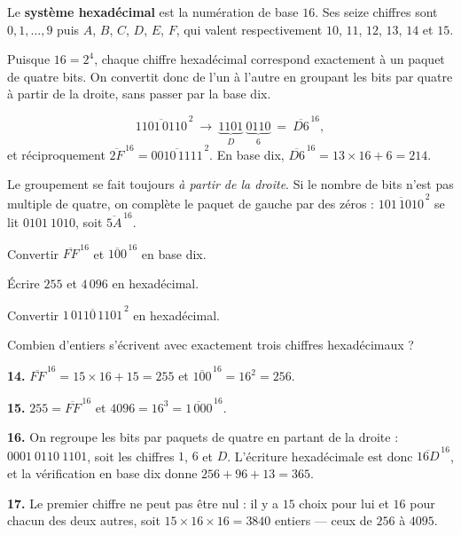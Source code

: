 \begin{definition}
Le \textbf{système hexadécimal} est la numération de base $16$. Ses seize
chiffres sont $0,1,\dots,9$ puis $A$, $B$, $C$, $D$, $E$, $F$, qui valent
respectivement $10$, $11$, $12$, $13$, $14$ et $15$.
\end{definition}

\begin{propriete}
Puisque $16 = 2^{4}$, chaque chiffre hexadécimal correspond exactement à un
paquet de quatre bits. On convertit donc de l'un à l'autre en groupant les
bits par quatre à partir de la droite, sans passer par la base dix.
\end{propriete}

\begin{exemple}
\[
  \overline{1101\,0110}^{\,2}
  \ \longrightarrow\ \underbrace{1101}_{D}\ \underbrace{0110}_{6}
  \ =\ \overline{D6}^{\,16},
\]
et réciproquement $\overline{2F}^{\,16} = \overline{0010\,1111}^{\,2}$. En
base dix, $\overline{D6}^{\,16} = 13\times16+6 = 214$.
\end{exemple}

\begin{avertissement}
Le groupement se fait toujours \emph{à partir de la droite}. Si le nombre de
bits n'est pas multiple de quatre, on complète le paquet de gauche par des
zéros : $\overline{101\,1010}^{\,2}$ se lit $0101\ 1010$, soit
$\overline{5A}^{\,16}$.
\end{avertissement}

\begin{entrainement}[hexadécimal]
\exo[\niveau{1}] Convertir $\overline{FF}^{\,16}$ et $\overline{100}^{\,16}$
en base dix.

\exo[\niveau{1}] Écrire $255$ et $4\,096$ en hexadécimal.

\exo[\niveau{2}] Convertir $\overline{1\,0110\,1101}^{\,2}$ en hexadécimal.

\exo[\niveau{3}] Combien d'entiers s'écrivent avec exactement trois chiffres
hexadécimaux ?
\end{entrainement}

\begin{corrige}
\textbf{14.} $\overline{FF}^{\,16} = 15\times16+15 = 255$ et
$\overline{100}^{\,16} = 16^{2} = 256$.

\textbf{15.} $255 = \overline{FF}^{\,16}$ et $4096 = 16^{3}
= \overline{1\,000}^{\,16}$.

\textbf{16.} On regroupe les bits par paquets de quatre en partant de la
droite : $0001\ 0110\ 1101$, soit les chiffres $1$, $6$ et $D$. L'écriture
hexadécimale est donc $\overline{16D}^{\,16}$, et la vérification en base dix
donne $256+96+13 = 365$.

\textbf{17.} Le premier chiffre ne peut pas être nul : il y a $15$ choix pour
lui et $16$ pour chacun des deux autres, soit
$15\times16\times16 = 3840$ entiers — ceux de $256$ à $4095$.
\end{corrige}

